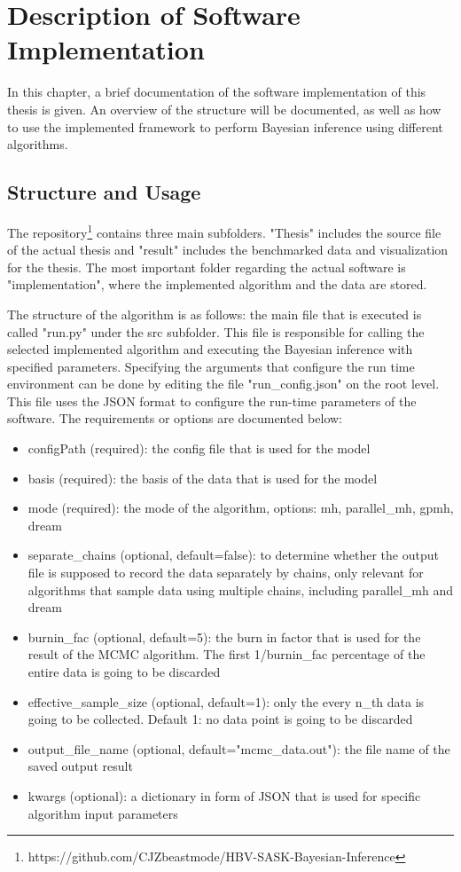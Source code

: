\chapter{Description of Software Implementation}
In this chapter, a brief documentation of the software implementation of this thesis is given. An overview of the structure will be documented, as well as how to use the implemented framework to perform Bayesian inference using different algorithms.

\section{Structure and Usage}
The repository\footnote{https://github.com/CJZbeastmode/HBV-SASK-Bayesian-Inference} contains three main subfolders. "Thesis" includes the source file of the actual thesis and "result" includes the benchmarked data and visualization for the thesis. The most important folder regarding the actual software is "implementation", where the implemented algorithm and the data are stored.

The structure of the algorithm is as follows: the main file that is executed is called "run.py" under the src subfolder. This file is responsible for calling the selected implemented algorithm and executing the Bayesian inference with specified parameters. Specifying the arguments that configure the run time environment can be done by editing the file "run\_config.json" on the root level. This file uses the JSON format to configure the run-time parameters of the software. The requirements or options are documented below:

\begin{itemize}
    \item configPath (required): the config file that is used for the model
    \item basis (required): the basis of the data that is used for the model
    \item mode (required): the mode of the algorithm, options: mh, parallel\_mh, gpmh, dream
    \item separate\_chains (optional, default=false): to determine whether the output file is supposed to record the data separately by chains, only relevant for algorithms that sample data using multiple chains, including parallel\_mh and dream
    \item burnin\_fac (optional, default=5): the burn in factor that is used for the result of the MCMC algorithm. The first 1/burnin\_fac percentage of the entire data is going to be discarded
    \item effective\_sample\_size (optional, default=1): only the every n\_th data is going to be collected. Default 1: no data point is going to be discarded
    \item output\_file\_name (optional, default="mcmc\_data.out"): the file name of the saved output result
    \item kwargs (optional): a dictionary in form of JSON that is used for specific algorithm input parameters
\end{itemize}

